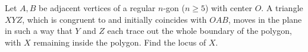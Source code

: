 Let $A,B$ be adjacent vertices of a regular $n$-gon ($n\ge5$) with center $O$. A triangle $XYZ$,  which is congruent to and initially coincides with $OAB$,  moves in the plane in such a way that $Y$ and $Z$ each trace out the whole boundary of the polygon, with $X$ remaining inside the polygon. Find the locus of $X$.
